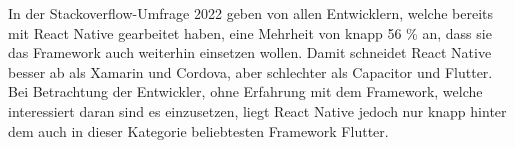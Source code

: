 In der Stackoverflow-Umfrage 2022 \cite{Stackoverflow_2022} geben von allen Entwicklern, welche bereits mit React Native gearbeitet haben, eine Mehrheit von knapp 56 \% an, dass sie das Framework auch weiterhin einsetzen wollen.
Damit schneidet React Native besser ab als Xamarin und Cordova, aber schlechter als Capacitor und Flutter.
Bei Betrachtung der Entwickler, ohne Erfahrung mit dem Framework, welche interessiert daran sind es einzusetzen, liegt React Native jedoch nur knapp hinter dem auch in dieser Kategorie beliebtesten Framework Flutter.